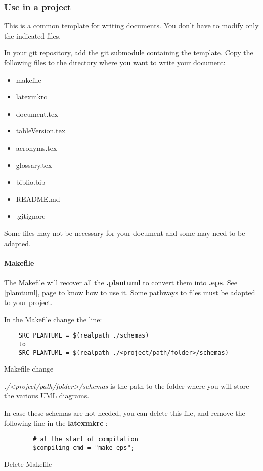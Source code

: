 \subsubsection{Use in a project}
This is a common template for writing documents. You don't have to modify only the indicated files.

In your git repository, add the git submodule containing the template.
Copy the following files to the directory where you want to write your document:
\begin{itemize}
    \item makefile
    \item latexmkrc
    \item document.tex
    \item tableVersion.tex
    \item acronyms.tex
    \item glossary.tex
    \item biblio.bib
    \item README.md
    \item .gitignore
\end{itemize}

Some files may not be necessary for your document and some may need to be adapted.

\paragraph{Makefile}
The Makefile will recover all the \textbf{.plantuml} to convert them into \textbf{.eps}. See
\ref{plamtuml}, page \pageref{plamtuml} to know how to use it.
Some pathways to files must be adapted to your project.

In the Makefile change the line:
\begin{code}
    \begin{verbatim}
    SRC_PLANTUML = $(realpath ./schemas)
    to
    SRC_PLANTUML = $(realpath ./<project/path/folder>/schemas)
\end{verbatim}
    \caption{Makefile change}
\end{code}

\emph{./<project/path/folder>/schemas} is the path to the folder where you will store the various
UML diagrams.\newline

In case these schemas are not needed, you can delete this file, and remove the following line in the
\textbf{latexmkrc} :
\begin{code}
    \begin{verbatim}
        # at the start of compilation
        $compiling_cmd = "make eps";
    \end{verbatim}
    \caption{Delete Makefile}
\end{code}


